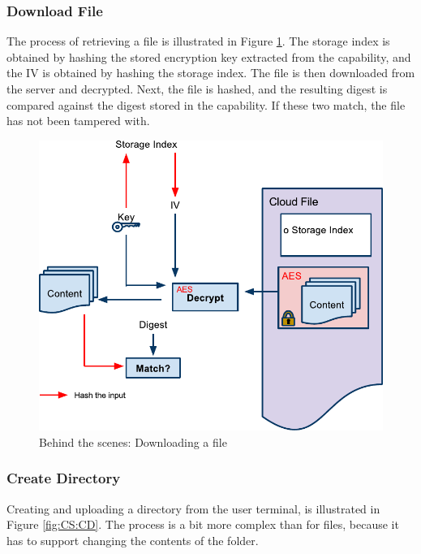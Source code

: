 \documentclass[pdftex,english,10pt,b5paper,twoside]{book}
\begin{document}
\subsubsection{Download File}
\label{sec:CS:OF}

The process of retrieving a file is illustrated in Figure \ref{fig:CS:OF}. The
storage index is obtained by hashing the stored encryption key extracted from
the capability, and the \ac{IV} is obtained by hashing the storage index. The
file is then downloaded from the server and decrypted. Next, the file is
hashed, and the resulting digest is compared against the digest stored in the
capability. If these two match, the file has not been tampered with.

\begin{figure}[h!]
    \centering
    \includegraphics[width=\columnwidth]{CryptoOpenFile.pdf}
    \caption{Behind the scenes: Downloading a file}
    \label{fig:CS:OF}
\end{figure}

\subsubsection{Create Directory}

Creating and uploading a directory from the user terminal, is illustrated in
Figure \ref{fig:CS:CD}. The process is a bit more complex than for files,
because it has to support changing the contents of the folder.
\end{document}
